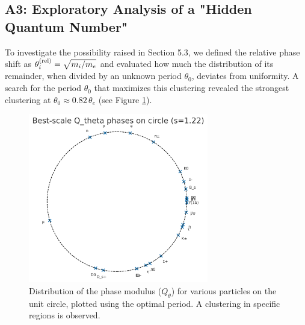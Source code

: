 \documentclass[11pt,a4paper]{article}
\begin{document}
\subsection{A3: Exploratory Analysis of a "Hidden Quantum Number"}
To investigate the possibility raised in Section 5.3, we defined the relative phase shift as $\theta_i^{\rm(rel)}=\sqrt{m_i/m_e}$ and evaluated how much the distribution of its remainder, when divided by an unknown period $\theta_0$, deviates from uniformity. A search for the period $\theta_0$ that maximizes this clustering revealed the strongest clustering at $\theta_0 \approx 0.82\,\theta_e$ (see Figure \ref{fig:hidden_quantum_number}).
\begin{figure}[h!]
    \centering
    \includegraphics[width=0.7\textwidth]{A3_plot.png}
    \caption{Distribution of the phase modulus ($Q_\theta$) for various particles on the unit circle, plotted using the optimal period. A clustering in specific regions is observed.}
    \label{fig:hidden_quantum_number}
\end{figure}
\end{document}

